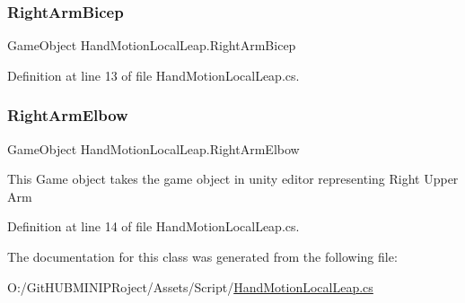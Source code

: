 \subsubsection{\texorpdfstring{RightArmBicep}{RightArmBicep}}
{\footnotesize\ttfamily Game\+Object Hand\+Motion\+Local\+Leap.\+Right\+Arm\+Bicep}



Definition at line 13 of file Hand\+Motion\+Local\+Leap.\+cs.

\mbox{\label{class_hand_motion_local_leap_a28df059b108d4b84273864b46842fc97}} 
\subsubsection{\texorpdfstring{RightArmElbow}{RightArmElbow}}
{\footnotesize\ttfamily Game\+Object Hand\+Motion\+Local\+Leap.\+Right\+Arm\+Elbow}

This Game object takes the game object in unity editor representing Right Upper Arm 

Definition at line 14 of file Hand\+Motion\+Local\+Leap.\+cs.



The documentation for this class was generated from the following file\+:\begin{DoxyCompactItemize}
\item 
O\+:/\+Git\+H\+U\+B\+M\+I\+N\+I\+P\+Roject/\+Assets/\+Script/\mbox{\hyperlink{_hand_motion_local_leap_8cs}{Hand\+Motion\+Local\+Leap.\+cs}}\end{DoxyCompactItemize}
